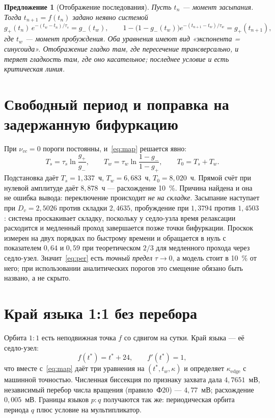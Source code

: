 \documentclass[11pt,a4paper]{article}
\newtheorem{prop}{Предложение}
\begin{document}
\begin{prop}[Отображение последования]\label{prop:map}
Пусть $t_n$ --- момент засыпания. Тогда $t_{n+1}=f(t_n)$ задано неявно системой
\begin{equation}\label{eq:map}
g_+(t_n)\,e^{-(t_w-t_n)/\tau_s}=g_-(t_w),\qquad
1-\bigl(1-g_-(t_w)\bigr)e^{-(t_{n+1}-t_w)/\tau_w}=g_+(t_{n+1}),
\end{equation}
где $t_w$ --- момент пробуждения. Оба уравнения имеют вид «экспонента = синусоида». Отображение
гладко там, где пересечение трансверсально, и теряет гладкость там, где оно касательное; последнее
условие и есть критическая линия.
\end{prop}

\section{Свободный период и поправка на задержанную бифуркацию}
При $\nu_{vc}=0$ пороги постоянны, и~\eqref{eq:map} решается явно:
\begin{equation}\label{eq:per}
T_s=\tau_s\ln\frac{g_+}{g_-},\qquad
T_w=\tau_w\ln\frac{1-g_-}{1-g_+},\qquad T_0=T_s+T_w .
\end{equation}
Подстановка даёт $T_s=1{,}337$~ч, $T_w=6{,}683$~ч, $T_0=8{,}020$~ч. Прямой счёт при нулевой
амплитуде даёт $8{,}878$~ч --- расхождение 10~\%. Причина найдена и она не ошибка вывода:
переключение происходит \emph{не на складке}. Засыпание наступает при $D_v=2{,}5026$ против складки
$2{,}4635$, пробуждение при $1{,}3794$ против $1{,}4503$: система проскакивает складку, поскольку у
седло-узла время релаксации расходится и медленный проход завершается позже точки бифуркации.
Проскок измерен на двух порядках по быстрому времени и обращается в нуль с показателем $0{,}64$ и
$0{,}59$ при теоретическом $2/3$ для медленного прохода через седло-узел. Значит~\eqref{eq:per}
есть \emph{точный предел} $\tau\to0$, а модель стоит в 10~\% от него; при использовании
аналитических порогов это смещение обязано быть названо, а не скрыто.

\section{Край языка 1:1 без перебора}
Орбита $1{:}1$ есть неподвижная точка $f$ со сдвигом на сутки. Край языка --- её седло-узел:
\begin{equation}\label{eq:edge}
f(t^*)=t^*+24,\qquad f'(t^*)=1,
\end{equation}
что вместе с~\eqref{eq:map} даёт три уравнения на $(t^*,t_w,\kappa)$ и определяет
$\kappa_{\mathrm{edge}}$ с машинной точностью. Численная биссекция по признаку захвата дала
$4{,}7651$~мВ, независимый перебор числа вращения (правило~Ф20) --- $4{,}77$~мВ; расхождение
$0{,}005$~мВ. Границы языков $p{:}q$ получаются так же: периодическая орбита периода $q$ плюс
условие на мультипликатор.
\end{document}
